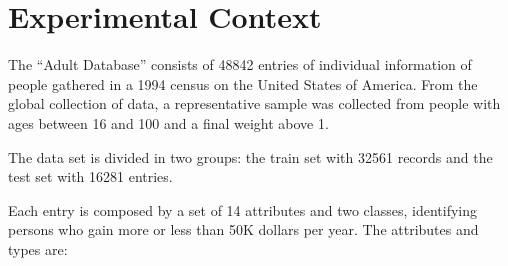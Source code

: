 \documentclass[a4paper]{llncs}
\begin{document}
\section{Experimental Context}

The ``Adult Database'' consists of 48842 entries of individual information of 
people gathered in a 1994 census on the United States of America. From the
global collection of data, a representative sample was collected from people
with ages between 16 and 100 and a final weight above 1.

The data set is divided in two groups: the train set with 32561 records and the test set with 16281 entries.

Each entry is composed by a set of 14 attributes and two classes, identifying
persons who gain more or less than 50K dollars per year. The attributes and types are:
\end{document}
